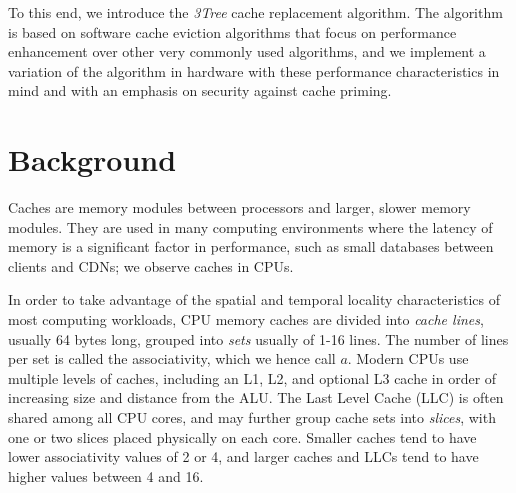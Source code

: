 \documentclass[sigconf, screen, review]{acmart}
\begin{document}
To this end, we introduce the \textit{3Tree} cache replacement algorithm.
The algorithm is based on software cache eviction algorithms that focus on
performance enhancement over other very commonly used algorithms,
and we implement a variation of the algorithm in hardware
with these performance characteristics in mind
and with an emphasis on security against cache priming.


\section{Background}


Caches are memory modules between processors and larger, slower memory modules.
They are used in many computing environments where the latency of memory
is a significant factor in performance,
such as small databases between clients and CDNs; we observe caches in CPUs.

In order to take advantage of the spatial and temporal locality characteristics
of most computing workloads,
CPU memory caches are divided into \textit{cache lines}, usually 64 bytes long,
grouped into \textit{sets} usually of 1-16 lines.
The number of lines per set is called the associativity, which we hence call $a$.
Modern CPUs use multiple levels of caches, including an L1, L2, and optional L3 cache
in order of increasing size and distance from the ALU.
The Last Level Cache (LLC) is often shared among all CPU cores, and may further group
cache sets into \textit{slices}, with one or two slices placed physically on each core.
Smaller caches tend to have lower associativity values of 2 or 4, and larger caches and LLCs
tend to have higher values between 4 and 16.
\end{document}
